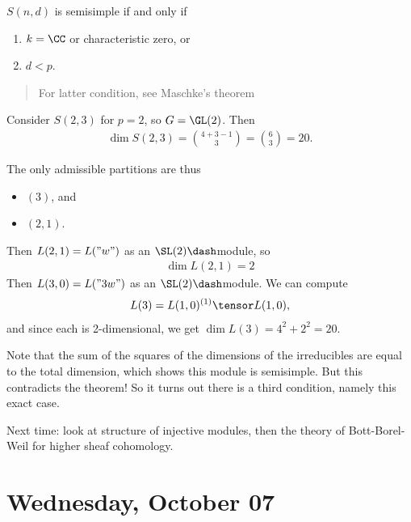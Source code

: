 \begin{theorem}[?]

\(S(n, d)\) is semisimple if and only if

\begin{enumerate}
\def\labelenumi{\arabic{enumi}.}
\item
  \(k = \CC\) or characteristic zero, or
\item
  \(d < p\).
\end{enumerate}

\begin{quote}
For latter condition, see Maschke's theorem
\end{quote}

\end{theorem}

\begin{example}

Consider \(S(2, 3)\) for \(p=2\), so \(G = \GL(2)\). Then
\begin{align*}  
\dim S(2, 3) = {4+3-1 \choose 3} = {6\choose 3} = 20
.\end{align*}

The only admissible partitions are thus

\begin{itemize}
\tightlist
\item
  \((3)\), and
\item
  \((2, 1)\).
\end{itemize}

Then \(L(2, 1) = L("w")\) as an \(\SL(2)\dash\)module, so
\begin{align*}
\dim L(2, 1) = 2
\end{align*} Then \(L(3, 0) = L("3w")\) as an \(\SL(2)\dash\)module. We
can compute
\begin{align*}  
L(3) = L(1, 0)^{(1)} \tensor L(1, 0)
,\end{align*} and since each is 2-dimensional, we get
\(\dim L(3) = 4^2 + 2^2 = 20\).

Note that the sum of the squares of the dimensions of the irreducibles
are equal to the total dimension, which shows this module is semisimple.
But this contradicts the theorem! So it turns out there is a third
condition, namely this exact case.

\end{example}

Next time: look at structure of injective modules, then the theory of
Bott-Borel-Weil for higher sheaf cohomology.

\hypertarget{wednesday-october-07}{%
\section{Wednesday, October 07}\label{wednesday-october-07}}

